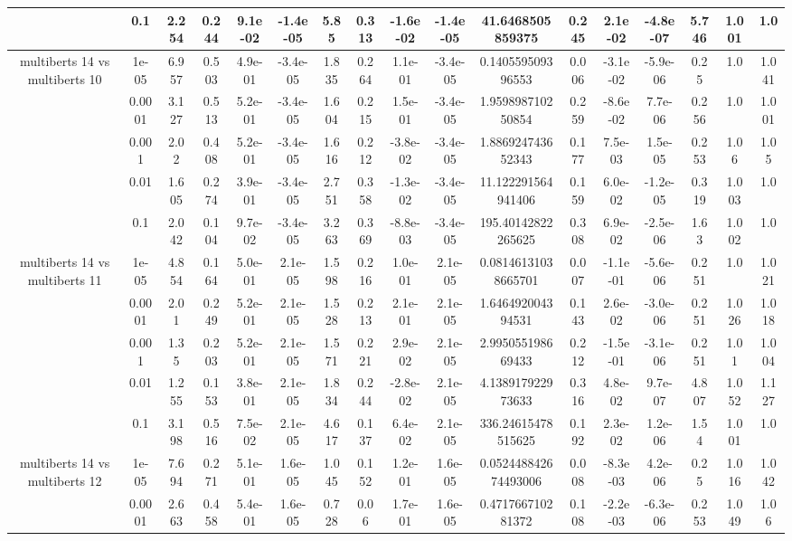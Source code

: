 \begin{tabular}{|c|c|c|c|c|c|c|c|c|c|c|c|c|c|c|c|c|}
 & 0.1 & 2.254 & 0.244 & 9.1e-02 & -1.4e-05 & 5.85 & 0.313 & -1.6e-02 & -1.4e-05 & 41.6468505859375 & 0.245 & 2.1e-02 & -4.8e-07 & 5.746 & 1.001 & 1.0 \\
\hline
\multirow{5}{*}{multiberts 14 vs multiberts 10} & 1e-05 & 6.957 & 0.503 & 4.9e-01 & -3.4e-05 & 1.835 & 0.264 & 1.1e-01 & -3.4e-05 & 0.140559509396553 & 0.006 & -3.1e-02 & -5.9e-06 & 0.25 & 1.0 & 1.041 \\
 & 0.0001 & 3.127 & 0.513 & 5.2e-01 & -3.4e-05 & 1.604 & 0.215 & 1.5e-01 & -3.4e-05 & 1.959898710250854 & 0.259 & -8.6e-02 & 7.7e-06 & 0.256 & 1.0 & 1.001 \\
 & 0.001 & 2.02 & 0.408 & 5.2e-01 & -3.4e-05 & 1.616 & 0.212 & -3.8e-02 & -3.4e-05 & 1.886924743652343 & 0.177 & 7.5e-03 & 1.5e-05 & 0.253 & 1.06 & 1.05 \\
 & 0.01 & 1.605 & 0.274 & 3.9e-01 & -3.4e-05 & 2.751 & 0.358 & -1.3e-02 & -3.4e-05 & 11.122291564941406 & 0.159 & 6.0e-02 & -1.2e-05 & 0.319 & 1.003 & 1.0 \\
 & 0.1 & 2.042 & 0.104 & 9.7e-02 & -3.4e-05 & 3.263 & 0.369 & -8.8e-03 & -3.4e-05 & 195.40142822265625 & 0.308 & 6.9e-02 & -2.5e-06 & 1.63 & 1.002 & 1.0 \\
\hline
\multirow{5}{*}{multiberts 14 vs multiberts 11} & 1e-05 & 4.854 & 0.164 & 5.0e-01 & 2.1e-05 & 1.598 & 0.216 & 1.0e-01 & 2.1e-05 & 0.08146131038665701 & 0.007 & -1.1e-01 & -5.6e-06 & 0.251 & 1.0 & 1.021 \\
 & 0.0001 & 2.01 & 0.249 & 5.2e-01 & 2.1e-05 & 1.528 & 0.213 & 2.1e-01 & 2.1e-05 & 1.646492004394531 & 0.143 & 2.6e-02 & -3.0e-06 & 0.251 & 1.026 & 1.018 \\
 & 0.001 & 1.35 & 0.203 & 5.2e-01 & 2.1e-05 & 1.571 & 0.221 & 2.9e-02 & 2.1e-05 & 2.995055198669433 & 0.212 & -1.5e-01 & -3.1e-06 & 0.251 & 1.01 & 1.004 \\
 & 0.01 & 1.255 & 0.153 & 3.8e-01 & 2.1e-05 & 1.834 & 0.244 & -2.8e-02 & 2.1e-05 & 4.138917922973633 & 0.316 & 4.8e-02 & 9.7e-07 & 4.807 & 1.052 & 1.127 \\
 & 0.1 & 3.198 & 0.516 & 7.5e-02 & 2.1e-05 & 4.617 & 0.137 & 6.4e-02 & 2.1e-05 & 336.24615478515625 & 0.192 & 2.3e-02 & 1.2e-06 & 1.54 & 1.001 & 1.0 \\
\hline
\multirow{5}{*}{multiberts 14 vs multiberts 12} & 1e-05 & 7.694 & 0.271 & 5.1e-01 & 1.6e-05 & 1.045 & 0.152 & 1.2e-01 & 1.6e-05 & 0.052448842674493006 & 0.008 & -8.3e-03 & 4.2e-06 & 0.25 & 1.016 & 1.042 \\
 & 0.0001 & 2.663 & 0.458 & 5.4e-01 & 1.6e-05 & 0.728 & 0.06 & 1.7e-01 & 1.6e-05 & 0.471766710281372 & 0.108 & -2.2e-03 & -6.3e-06 & 0.253 & 1.049 & 1.06 \\

\end{tabular}
